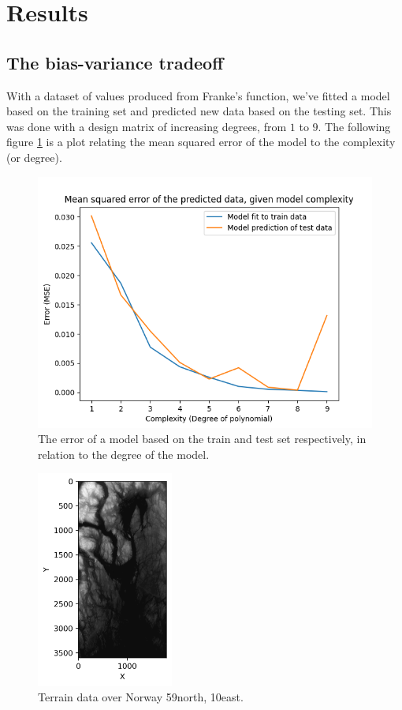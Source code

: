 \documentclass[../main.tex]{subfiles}
\begin{document}
\section{Results}\label{sec:results}

\subsection{The bias-variance tradeoff}
With a dataset of values produced from Franke's function, we've fitted a model based on the training set and predicted new data based on the testing set. This was done with a design matrix of increasing degrees, from $1$ to $9$. The following figure \ref{fig:result_complexity} is a plot relating the mean squared error of the model to the complexity (or degree).

\begin{figure}[h]
    \centering
    \includegraphics[width=\textwidth]{../assets/complexity.png}
    \caption{The error of a model based on the train and test set respectively, in relation to the degree of the model.}
    \label{fig:result_complexity}
\end{figure}

\begin{figure}[htb] 
   \centering
   \includegraphics[width=0.4\textwidth]{../assets/terrain_n59_e010.png} 
   \caption{Terrain data over Norway 59\degree north, 10\degree east.}
   \label{fig:terrain_Norway}
\end{figure} 
\end{document}
